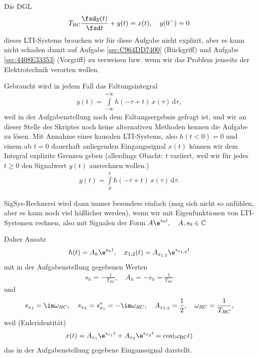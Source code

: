 \begin{Werkzeug}
Die DGL
\begin{equation}
T_\mathrm{RC} \frac{\fsd y(t)}{\fsd t} + y(t) = x(t),\quad y(0^-)=0
\end{equation}
dieses LTI-Systems brauchen wir für diese Aufgabe nicht explizit, aber es kann nicht
schaden damit auf Aufgabe \ref{sec:C964DD7400} (Rückgriff)
und Aufgabe \ref{sec:4408E33353} (Vorgriff) zu verweisen bzw. wenn wir das Problem
jenseits der Elektrotechnik verorten wollen.

Gebraucht wird in jedem Fall das Faltungsintegral
\begin{align}
y(t) = \int\limits_{-\infty}^{+\infty} h(-\tau+t) \, x(\tau) \, \mathrm{d}\tau,
\end{align}
weil in der Aufgabenstellung nach dem Faltungsergebnis gefragt ist, und wir an
dieser Stelle des Skriptes noch keine alternativen Methoden kennen die Aufgabe
zu lösen.
%
Mit Annahme eines kausalen LTI-Systems, also $h(t<0) = 0$ und einem ab $t=0$ dauerhaft
anliegenden Eingangssignal $x(t)$ können wir dem Integral explizite Grenzen geben
(allerdings Obacht: $t$ variiert, weil wir für jedes $t\geq 0$ den Signalwert $y(t)$
ausrechnen wollen.)
%
\begin{align}
y(t) = \int\limits_{0}^{t} h(-\tau+t) \, x(\tau) \, \mathrm{d}\tau.
\end{align}
\end{Werkzeug}
\begin{Ansatz}
SigSys-Rechnerei wird dann immer besonders einfach (mag sich nicht so anfühlen,
aber es kann noch viel häßlicher werden), wenn wir mit Eigenfunktionen von LTI-Systemen
rechnen, also mit Signalen der Form $A \e^{s_0 t},\quad A, s_0 \in \mathbb{C}$

\noindent Daher Ansatz
\begin{align}
h(t) = A_h \e^{s_h t}, \quad x_{1,2}(t) = A_{x_{1,2}} \e^{s_{x_{1,2}} t}
\end{align}
mit in der Aufgabenstellung gegebenen Werten
\begin{align}
s_h = -\frac{1}{T_{RC}},\quad A_h = -s_h = \frac{1}{T_{RC}}
\end{align}
und
\begin{align}
s_{x_1} = \im\omega_{RC},\quad s_{x_2} = s^*_{x_1} = -\im\omega_{RC}, \quad A_{x_{1,2}}=\frac{1}{2},\quad \omega_{RC} = \frac{1}{T_{RC}},
\end{align}
weil (Euleridentität)
\begin{align}
x(t) = A_{x_{1}} \e^{s_{x_{1}} t} + A_{x_{2}} \e^{s_{x_{2}} t} = \cos(\omega_\mathrm{RC} t)
\end{align}
das in der Aufgabenstellung gegebene Einganssignal darstellt.
\end{Ansatz}
